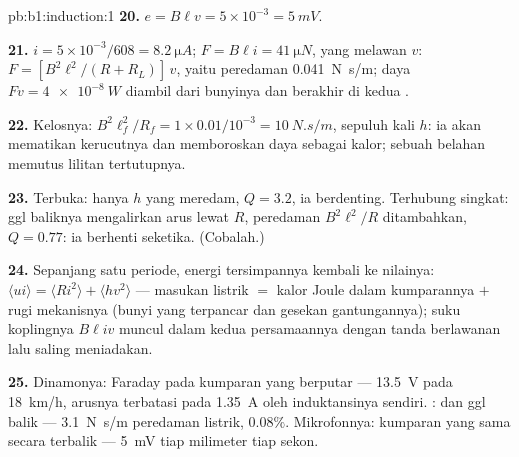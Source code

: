 \begin{solution}{pb:b1:induction:1}
\textbf{20.} $e = B\ell v = 5 \times 10^{-3} = \qty{5}{mV}$.

\textbf{21.} $i = 5 \times 10^{-3}/608 = \qty{8.2}{\micro A}$; $F = B\ell i = \qty{41}{\micro N}$,
yang melawan $v$: $F = [B^2\ell^2/(R + R_L)]\,v$, yaitu peredaman \qty{0.041}{N.s/m};
daya $Fv = \qty{4e-8}{W}$ diambil dari bunyinya dan berakhir di
kedua .

\textbf{22.} Kelosnya: $B^2\ell_f^2/R_f = 1 \times 0.01/10^{-3} = \qty{10}{N.s/m}$, sepuluh
kali $h$: ia akan mematikan kerucutnya dan memboroskan daya sebagai kalor; sebuah belahan
memutus lilitan tertutupnya.

\textbf{23.} Terbuka: hanya $h$ yang meredam, $Q = 3.2$, ia berdenting. Terhubung singkat: ggl
baliknya mengalirkan arus lewat $R$, peredaman $B^2\ell^2/R$ ditambahkan,
$Q = 0.77$: ia berhenti seketika. (Cobalah.)

\textbf{24.} Sepanjang satu periode, energi tersimpannya kembali ke nilainya:
$\langle ui\rangle = \langle Ri^2\rangle + \langle hv^2\rangle$ --- masukan listrik $=$
kalor Joule dalam kumparannya $+$ rugi mekanisnya (bunyi yang terpancar dan
gesekan gantungannya); suku koplingnya $B\ell iv$ muncul dalam kedua
persamaannya dengan tanda berlawanan lalu saling meniadakan.

\textbf{25.} Dinamonya: Faraday pada kumparan yang berputar --- \qty{13.5}{V} pada
\qty{18}{km/h}, arusnya terbatasi pada \qty{1.35}{A} oleh induktansinya sendiri.
:  dan ggl balik --- \qty{3.1}{N.s/m} peredaman
listrik,  $0.08\%$. Mikrofonnya: kumparan yang sama secara terbalik ---
\qty{5}{mV} tiap milimeter tiap sekon.
\end{solution}
